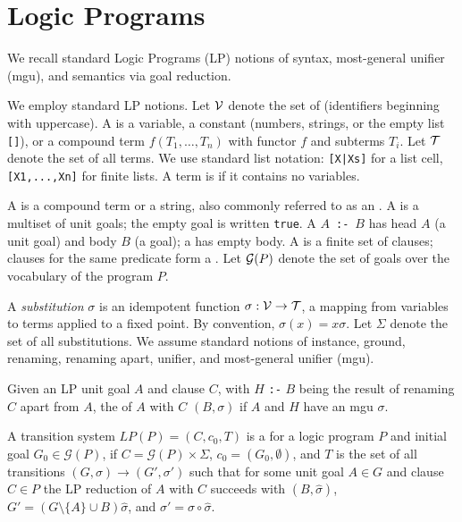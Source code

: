 \section{Logic Programs}\label{appendix:lp}

We recall standard Logic Programs (LP) notions of syntax, most-general unifier (mgu), and semantics via goal reduction.

\begin{definition}
\label{def:lp-syntax}
We employ standard LP notions. Let $\mathcal{V}$ denote the set of  (identifiers beginning with uppercase). A  is a variable, a constant (numbers, strings, or the empty list \verb|[]|), or a compound term $f(T_1,\ldots,T_n)$ with functor $f$ and subterms $T_i$. Let $\mathcal{T}$ denote the set of all terms. We use standard list notation: \verb=[X|Xs]= for a list cell, \verb|[X1,...,Xn]| for finite lists. A term is  if it contains no variables.

A  is a compound term or a string, also commonly referred to as an . A  is a multiset of unit goals; the empty goal is written \verb|true|. A  $A$~\verb|:-|~$B$ has head $A$ (a unit goal) and body $B$ (a goal); a  has empty body. A  is a finite set of clauses; clauses for the same predicate form a . Let $\mathcal{G}(P)$ denote the set of goals over the vocabulary of the program $P$.
\end{definition}

A \emph{substitution} $\sigma$ is an idempotent function $\sigma: \mathcal{V} \to \mathcal{T}$, a mapping from variables to terms applied to a fixed point. By convention, $\sigma(x)=x\sigma$. Let $\Sigma$ denote the set of all substitutions. We assume standard notions of instance, ground, renaming, renaming apart, unifier, and most-general unifier (mgu).

\begin{definition}
\label{def:lp-reduction}
Given an LP unit goal $A$ and clause $C$, with $H$ \verb|:-| $B$ being the result of renaming $C$ apart from $A$, the  of $A$ with $C$  $(B,\sigma)$ if $A$ and $H$ have an mgu $\sigma$.
\end{definition}

\begin{definition}
\label{def:lp-ts}
A transition system $LP(P) = (C, c_0, T)$ is a  for a logic program $P$ and initial goal $G_0 \in \mathcal{G}(P)$, if $C=\mathcal{G}(P)\times \Sigma$, $c_0=(G_0,\emptyset)$, and $T$ is the set of all transitions $(G,\sigma) \rightarrow (G',\sigma')$ such that for some unit goal $A \in G$ and clause $C \in P$ the LP reduction of $A$ with $C$ succeeds with $(B,\hat\sigma)$, $G' = (G \setminus \{A\} \cup B)\hat\sigma$, and $\sigma'=\sigma\circ\hat\sigma$.
\end{definition}

